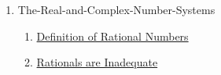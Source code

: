 \clearpage
\renewcommand{\notetitle}{Table of Contents}
\label{toc}
\begin{enumerate}

\item The-Real-and-Complex-Number-Systems
\begin{enumerate}
\item \hyperref[202501131947]{Definition of Rational Numbers}
\item \hyperref[202501132004]{Rationals are Inadequate}
\end{enumerate}
\end{enumerate}

\newpage
